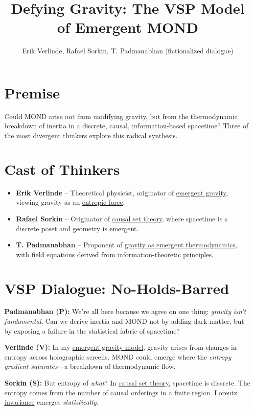 \documentclass[12pt]{article}
\title{Defying Gravity: The VSP Model of Emergent MOND}
\author{Erik Verlinde, Rafael Sorkin, T. Padmanabhan (fictionalized dialogue)}
\date{}
\begin{document}
\maketitle

\section*{Premise}
Could MOND arise not from modifying gravity, but from the thermodynamic breakdown of inertia in a discrete, causal, information-based spacetime? Three of the most divergent thinkers explore this radical synthesis.

\section*{Cast of Thinkers}

\begin{itemize}
    \item \textbf{Erik Verlinde} -- Theoretical physicist, originator of \href{https://arxiv.org/abs/1001.0785}{emergent gravity}, viewing gravity as an \href{https://arxiv.org/abs/1001.0785}{entropic force}.
    \item \textbf{Rafael Sorkin} -- Originator of \href{https://arxiv.org/abs/gr-qc/0309009}{causal set theory}, where spacetime is a discrete poset and geometry is emergent.
    \item \textbf{T. Padmanabhan} -- Proponent of \href{https://arxiv.org/abs/1207.0505}{gravity as emergent thermodynamics}, with field equations derived from information-theoretic principles.
\end{itemize}

\section*{VSP Dialogue: No-Holds-Barred}

\textbf{Padmanabhan (P):} We're all here because we agree on one thing: \textit{gravity isn’t fundamental}. Can we derive inertia and MOND not by adding dark matter, but by exposing a failure in the statistical fabric of spacetime?

\textbf{Verlinde (V):} In my \href{https://arxiv.org/abs/1611.02269}{emergent gravity model}, gravity arises from changes in entropy across holographic screens. MOND could emerge where the \textit{entropy gradient saturates}—a breakdown of thermodynamic flow.

\textbf{Sorkin (S):} But entropy of \textit{what}? In \href{https://arxiv.org/abs/gr-qc/0309009}{causal set theory}, spacetime is discrete. The entropy comes from the number of causal orderings in a finite region. \href{https://en.wikipedia.org/wiki/Lorentz_covariance}{Lorentz invariance} emerges \textit{statistically}.
\end{document}
